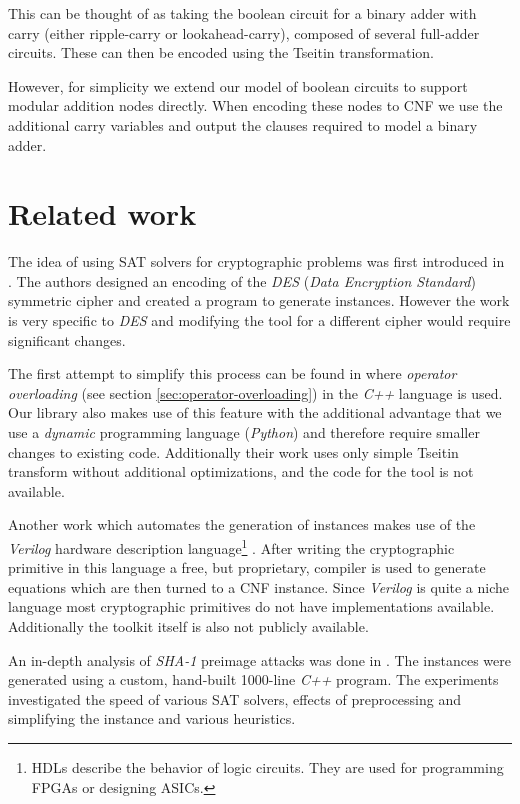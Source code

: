 This can be thought of as taking the boolean circuit for a binary adder with carry (either ripple-carry or lookahead-carry), composed of several full-adder circuits.
These can then be encoded using the Tseitin transformation.

However, for simplicity we extend our model of boolean circuits to support modular addition nodes directly.
When encoding these nodes to CNF we use the additional carry variables and output the clauses required to model a binary adder.

\section{Related work}
\label{sec:related-work}
The idea of using SAT solvers for cryptographic problems was first introduced in \cite{massacci2000logical}.
The authors designed an encoding of the \emph{DES} (\emph{Data Encryption Standard}) symmetric cipher and created a program to generate instances.
However the work is very specific to \emph{DES} and modifying the tool for a different cipher would require significant changes.

The first attempt to simplify this process can be found in \cite{jovanovic2005logical} where \emph{operator overloading} (see section \ref{sec:operator-overloading}) in the \emph{C++} language is used.
Our library also makes use of this feature with the additional advantage that we use a \emph{dynamic} programming language (\emph{Python}) and therefore require smaller changes to existing code.
Additionally their work uses only simple Tseitin transform without additional optimizations, and the code for the tool is not available.

Another work which automates the generation of instances makes use of the \emph{Verilog} hardware description language\footnote{HDLs describe the behavior of logic circuits. They are used for programming FPGAs or designing ASICs.} \cite{morawiecki2013sat}.
After writing the cryptographic primitive in this language a free, but proprietary, compiler is used to generate equations which are then turned to a CNF instance.
Since \emph{Verilog} is quite a niche language most cryptographic primitives do not have implementations available.
Additionally the toolkit itself is also not publicly available.

An in-depth analysis of \emph{SHA-1} preimage attacks was done in \cite{nossum2012sat}.
The instances were generated using a custom, hand-built 1000-line \emph{C++} program.
The experiments investigated the speed of various SAT solvers, effects of preprocessing and simplifying the instance and various heuristics.


%
%
% 
